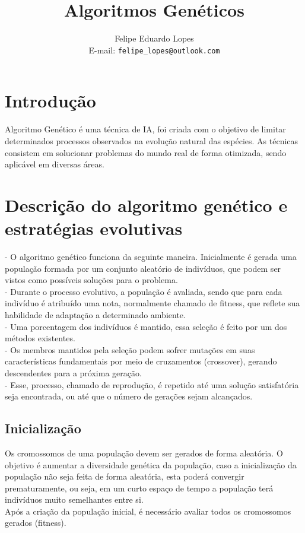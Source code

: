 \documentclass[a4paper,11pt]{article}
\title{Algoritmos Genéticos}
\author{Felipe Eduardo Lopes\\E-mail: {\tt felipe\_lopes@outlook.com}}
\date{}
\begin{document}
\maketitle

\begin{multicols}{2}

\section{Introdução}
Algoritmo Genético é uma técnica de IA, foi criada com o objetivo de limitar determinados processos observados na evolução natural das espécies. As técnicas consistem em solucionar problemas do mundo real de forma otimizada, sendo aplicável em diversas áreas. \cite{ref:ref_01}

\section{Descrição do algoritmo genético e estratégias evolutivas}
- O algoritmo genético funciona da seguinte maneira.
Inicialmente é gerada uma população formada por um conjunto aleatório de indivíduos, que podem ser vistos como possíveis soluções para o problema.\\
- Durante o processo evolutivo, a população é avaliada, sendo que para cada indivíduo é atribuído uma nota, normalmente chamado de fitness, que reflete sua habilidade de adaptação a determinado ambiente.\\
- Uma porcentagem dos indivíduos é mantido, essa seleção é feito por um dos métodos existentes.\\
- Os membros mantidos pela seleção podem sofrer mutações em suas características fundamentais por meio de cruzamentos (crossover),  gerando descendentes para a próxima geração.\\
- Esse, processo, chamado de reprodução, é repetido até uma solução satisfatória seja encontrada, ou até que o número de gerações sejam alcançados.\\

\subsection{Inicialização}
Os cromossomos de uma população devem ser gerados de forma aleatória. O objetivo é aumentar a diversidade genética da população, caso a inicialização da população não seja feita de forma aleatória, esta poderá convergir prematuramente, ou seja, em um curto espaço de  tempo a população terá indivíduos muito semelhantes entre si.\\
Após a criação da população inicial, é necessário avaliar todos os cromossomos gerados (fitness).


\end{multicols}
\end{document}
